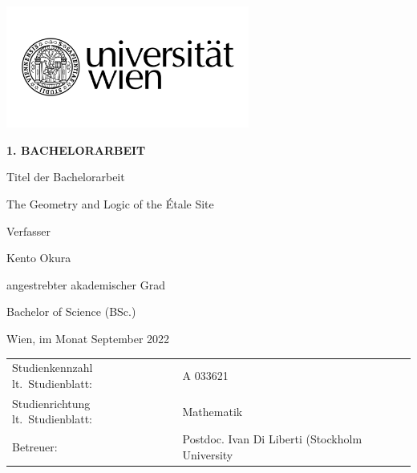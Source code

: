\begin{titlingpage}
	\begin{flushright}
		\includegraphics[width=8cm]{Uni_Logo_2016_SW}
	\end{flushright}

	\begin{center}  %
		\Huge{\textbf{\textsf{\MakeUppercase{
						1. Bachelorarbeit
					}}}}
		\vspace{2cm}

		\large{\textsf{  %
				Titel der Bachelorarbeit
			}}
		\vspace{.1cm}

		\LARGE{\textsf{  The Geometry and Logic of the \'Etale Site
			}}
		\vspace{3cm}

		\large{\textsf{  %
				Verfasser
			}}

		\Large{\textsf{  Kento Okura
			}}
		\vspace{3cm}

		\large{\textsf{
				angestrebter akademischer Grad  %
			}}

		\Large{\textsf{  %
				Bachelor of Science (BSc.)
			}}
	\end{center}
	\vspace{2cm}

	\noindent\textsf{Wien, im Monat September 2022}  %
	\vfill

	\noindent\begin{tabular}{@{}ll}
		\textsf{Studienkennzahl lt.\ Studienblatt:}
		 &
		\textsf{A 033621}  %
		\\
		\textsf{Studienrichtung lt.\ Studienblatt:}
		 &
		\textsf{Mathematik}  %
		\\
		\textsf{Betreuer: }
		 &
		\textsf{Postdoc. Ivan Di Liberti (Stockholm University}  %
	\end{tabular}

\end{titlingpage}
